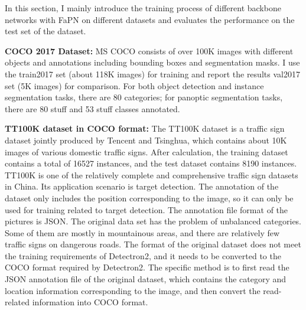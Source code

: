 
In this section, I mainly introduce the training process of different backbone networks with FaPN on different datasets and evaluates the performance on the test set of the dataset.

\textbf{COCO 2017 Dataset: }MS COCO \cite{lin2014microsoft} consists of over 100K images with different objects and annotations including bounding boxes and segmentation masks. I use the train2017 set (about 118K images) for training and report the results val2017 set (5K images) for comparison. For both object detection and instance segmentation tasks, there are 80 categories; for panoptic segmentation tasks, there are 80 stuff and 53 stuff classes annotated.

\textbf{TT100K dataset in COCO format:} The TT100K dataset is a traffic sign dataset jointly produced by Tencent and Tsinghua, which contains about 10K images of various domestic traffic signs. After calculation, the training dataset contains a total of 16527 instances, and the test dataset contains 8190 instances. TT100K is one of the relatively complete and comprehensive traffic sign datasets in China. Its application scenario is target detection. The annotation of the dataset only includes the position corresponding to the image, so it can only be used for training related to target detection. The annotation file format of the pictures is JSON. The original data set has the problem of unbalanced categories. Some of them are mostly in mountainous areas, and there are relatively few traffic signs on dangerous roads. The format of the original dataset does not meet the training requirements of Detectron2, and it needs to be converted to the COCO format required by Detectron2. The specific method is to first read the JSON annotation file of the original dataset, which contains the category and location information corresponding to the image, and then convert the read-related information into COCO format.

